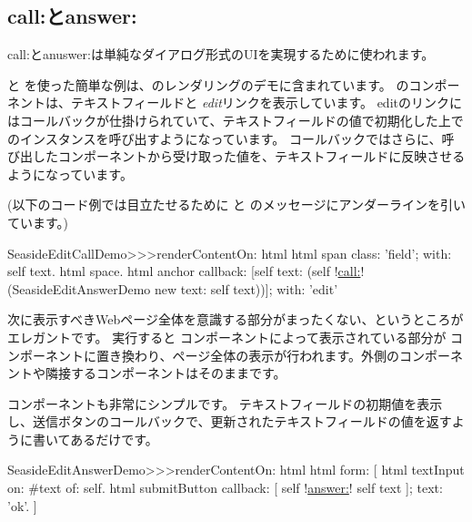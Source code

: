 \documentclass[a4paper,10pt,twoside]{book}
\begin{document}
\subsection{call:とanswer:}

call:とanuswer:は単純なダイアログ形式のUIを実現するために使われます。

 と  を使った簡単な例は、のレンダリングのデモに含まれています。
 のコンポーネントは、テキストフィールドと \emph{edit}リンクを表示しています。
editのリンクにはコールバックが仕掛けられていて、テキストフィールドの値で初期化した上でのインスタンスを呼び出すようになっています。
コールバックではさらに、呼び出したコンポーネントから受け取った値を、テキストフィールドに反映させるようになっています。
 
(以下のコード例では目立たせるために  と  のメッセージにアンダーラインを引いています。)

\begin{code}{}
SeasideEditCallDemo>>>renderContentOn: html 
	html span
		class: 'field';
		with: self text.
	html space.
	html anchor
		callback: [self text: (self !\underline{call:}! (SeasideEditAnswerDemo new text: self text))];
		with: 'edit'
\end{code}{}

次に表示すべきWebページ全体を意識する部分がまったくない、というところがエレガントです。
実行すると  コンポーネントによって表示されている部分が  コンポーネントに置き換わり、ページ全体の表示が行われます。外側のコンポーネントや隣接するコンポーネントはそのままです。


 コンポーネントも非常にシンプルです。
テキストフィールドの初期値を表示し、送信ボタンのコールバックで、更新されたテキストフィールドの値を返すように書いてあるだけです。

\begin{code}{}
SeasideEditAnswerDemo>>>renderContentOn: html
	html form: [
		html textInput
			on: #text of: self.
		html submitButton
			callback: [ self !\underline{answer:}! self text ];
			text: 'ok'.
		]
\end{code}{}
\end{document}
